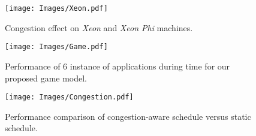\begin{figure}[!htb]
\centering
\texttt{[image: Images/Xeon.pdf]} %
\caption{Congestion effect on \textit{Xeon} and \textit{Xeon Phi} machines.}\label{Fig:congestion}
\end{figure}
\begin{figure}[!tb]
\centering
\texttt{[image: Images/Game.pdf]}%
\caption{Performance of 6 instance of applications during time for our proposed game model.}\label{Fig:performance_over_time}
\end{figure}
\begin{figure}[!htb]
\centering
\texttt{[image: Images/Congestion.pdf]}  %
\caption{Performance comparison of congestion-aware schedule versus static schedule.}\label{Fig:Perfomance_Comparison}
\end{figure}
